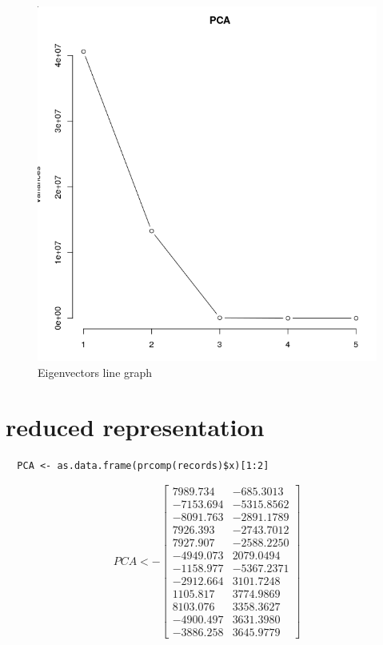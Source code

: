 \documentclass{report}
\begin{document}
\begin{figure}[H]
	\includegraphics[width=\linewidth]{eigenvectors graph.png}
	 \caption{Eigenvectors line graph}
	\label{fig:eigenvectorslinegraph}
\end{figure}

\section{reduced representation}

\begin{verbatim}	
  PCA <- as.data.frame(prcomp(records)$x)[1:2]
\end{verbatim}

\[
  PCA <- 
  \begin{bmatrix}
    7989.734 & -685.3013 \\
    -7153.694 & -5315.8562 \\
    -8091.763 & -2891.1789 \\
    7926.393 & -2743.7012 \\
    7927.907 & -2588.2250 \\
    -4949.073 & 2079.0494 \\
    -1158.977 & -5367.2371 \\
    -2912.664 & 3101.7248 \\
    1105.817 & 3774.9869 \\
    8103.076 & 3358.3627 \\
    -4900.497 & 3631.3980 \\
    -3886.258 & 3645.9779
  \end{bmatrix}
\]
\end{document}
